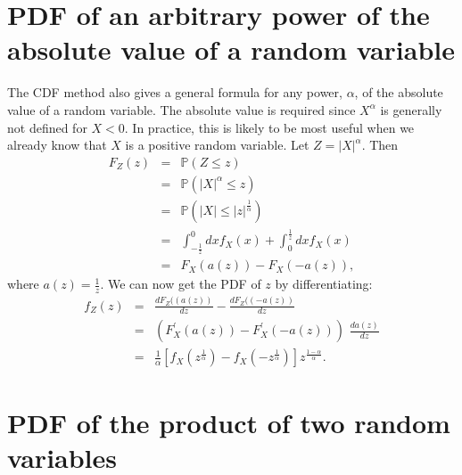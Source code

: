 \documentclass[11pt]{article}
\newcommand*{\bksp}{ \!\!\!\!\!}
\newcommand{\dd}[2]{\frac{d {#1}}{d {#2}}}
\begin{document}
\begin{multicols}{2}
\section{PDF of an arbitrary power of the absolute value of a random variable}

The CDF method also gives a general formula for any power, $\alpha$, of the absolute value of a random variable. The absolute value is required since $X^\alpha$ is generally not defined for $X<0$.  
In practice, this is likely to be most useful when we already know that $X$ is a positive random variable.
Let $Z=|X|^\alpha$. 
Then
\begin{eqnarray*}
F_Z(z) &=& \mathbb{P}(Z \leq z)\\
&=& \mathbb{P}(|X|^\alpha \leq z)\\
&=& \mathbb{P}(|X| \leq \left| z\right|^\frac{1}{\alpha})\\
&=& \int_{-\frac{1}{z}}^0 \bksp dx f_X(x) + \int_0^\frac{1}{z} \bksp dx f_X(x)\\
&=& F_X( a(z)) - F_X(-a(z)),
\end{eqnarray*}
where $a(z) = \frac{1}{z}$.
We can now get the PDF of $z$ by differentiating:
\begin{eqnarray}
\nonumber f_Z(z) &=& \dd{F_Z((a(z))}{z} - \dd{F_Z((-a(z))}{z}\\
\nonumber &=& \left(F_X^\prime( a(z) ) - F_X^\prime( -a(z) ) \right)\,\, \dd{a(z) }{z} \\
\label{eq-pdf-alpha}&=& \frac{1}{\alpha} \left[ f_X\left(z^\frac{1}{\alpha}\right) \! -\! f_X\left(-z^\frac{1}{\alpha}\right)\right] z^\frac{1-\alpha}{\alpha}.
\end{eqnarray}


\section{PDF of the product of two random variables}


\end{multicols}
\end{document}
